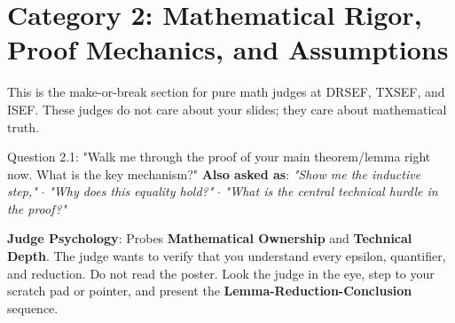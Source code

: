 \documentclass[11pt,letterpaper]{article}
\begin{document}
\newpage
\section{Category 2: Mathematical Rigor, Proof Mechanics, and Assumptions}

This is the make-or-break section for pure math judges at DRSEF, TXSEF, and ISEF. These judges do not care about your slides; they care about mathematical truth.

\begin{questionbox}{Question 2.1: "Walk me through the proof of your main theorem/lemma right now. What is the key mechanism?"}
\textbf{Also asked as}: \textit{"Show me the inductive step,"} $\cdot$ \textit{"Why does this equality hold?"} $\cdot$ \textit{"What is the central technical hurdle in the proof?"}
\end{questionbox}

\begin{strategybox}
\textbf{Judge Psychology}: Probes \textbf{Mathematical Ownership} and \textbf{Technical Depth}. The judge wants to verify that you understand every epsilon, quantifier, and reduction. Do not read the poster. Look the judge in the eye, step to your scratch pad or pointer, and present the \textbf{Lemma-Reduction-Conclusion} sequence.
\end{strategybox}
\end{document}
